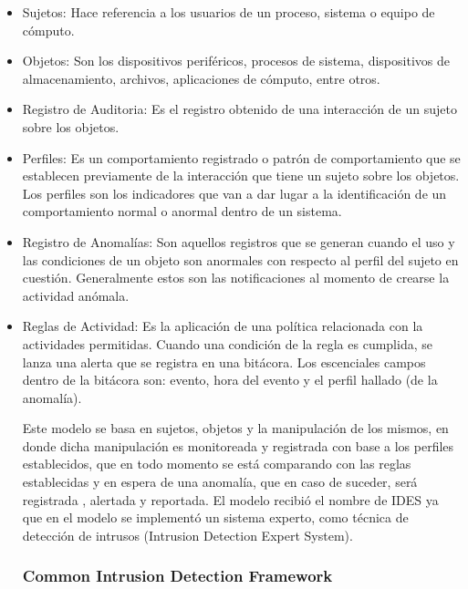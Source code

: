 \begin{itemize}
	\item Sujetos: Hace referencia a los usuarios de un proceso, sistema o equipo de cómputo.
	\item Objetos: Son los dispositivos periféricos, procesos de sistema, dispositivos de almacenamiento, archivos, aplicaciones de cómputo, entre otros.
	\item Registro de Auditoria: Es el registro obtenido de una interacción de un sujeto sobre los objetos.
	\item Perfiles: Es un comportamiento registrado o patrón de comportamiento que se establecen previamente de la interacción que tiene un sujeto sobre los objetos. Los perfiles son los indicadores que van a dar lugar a la identificación de un comportamiento normal o anormal dentro de un sistema.
	\item Registro de Anomalías: Son aquellos registros que se generan cuando el uso y las condiciones de un objeto son anormales con respecto al perfil del sujeto en cuestión. Generalmente estos son las notificaciones al momento de crearse la actividad anómala.
	\item Reglas de Actividad: Es la aplicación de una política relacionada con la actividades permitidas. Cuando una condición de la regla es cumplida, se lanza una alerta que se registra en una bitácora. Los escenciales campos dentro de la bitácora son: evento, hora del evento y el perfil hallado (de la anomalía).
	
	Este modelo se basa en sujetos, objetos y la manipulación de los mismos, en donde dicha manipulación es monitoreada y registrada con base a los perfiles establecidos, que en todo momento se está comparando con las reglas establecidas y en espera de una anomalía, que en caso de suceder, será registrada , alertada y reportada. El modelo recibió el nombre de IDES ya que en el modelo se implementó un sistema experto, como técnica de detección de intrusos (Intrusion Detection Expert System).\\
	
	\subsubsection{Common Intrusion Detection Framework}
	
	
	
	
\end{itemize}
